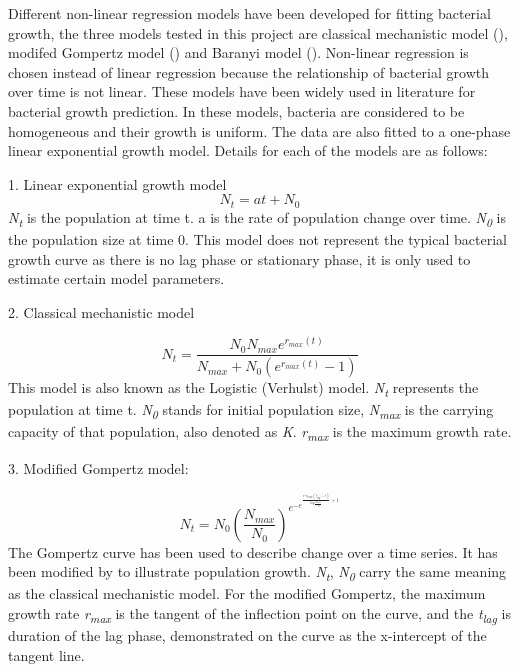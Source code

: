 \documentclass[11pt]{article}
\begin{document}
Different non-linear regression models have been developed for fitting bacterial growth, the three models tested in this project are classical mechanistic model (\citealt{verhulst1838notice}), modifed Gompertz model (\citealt{PMID:16348228}) and Baranyi model (\citealt{BARANYI1994277}). Non-linear regression is chosen instead of linear regression because the relationship of bacterial growth over time is not linear. These models have been widely used in literature for bacterial growth prediction. In these models, bacteria are considered to be homogeneous and their growth is uniform. The data are also fitted to a one-phase linear exponential growth model. Details for each of the models are as follows:

1. Linear exponential growth model
\begin{equation}
    N_{t} = at + N_{0}
\end{equation}
\emph{N\textsubscript{t}} is the population at time t. a is the rate of population change over time. \emph{N\textsubscript{0}} is the population size at time 0. This model does not represent the typical bacterial growth curve as there is no lag phase or stationary phase, it is only used to estimate certain model parameters. 

2. Classical mechanistic model

\begin{equation}
    N_{t} = \frac{N_{0} N_{max}  e^{r_{max}(t)}} {N_{max} + N_{0}  (e^{r_{max}(t)} - 1)}
\end{equation}
This model is also known as the Logistic (Verhulst) model. \emph{N\textsubscript{t}} represents the population at time t.  \emph{N\textsubscript{0}} stands for initial population size,  \emph{N\textsubscript{max}} is the carrying capacity of that population, also denoted as \emph{K}. \emph{r\textsubscript{max}} is the maximum growth rate. 

3. Modified Gompertz model:

\begin{equation}
    N_{t} = N_{0}(\frac{N_{max}}{N_{0}}) ^ {e ^ {-e ^ {\frac{e ^1 r_{max}(t_{lag} - t)}{log\frac{N_{max}}{N_{0}}} + 1}}}
\end{equation}
The Gompertz curve has been used to describe change over a time series. It has been modified by \citealt{PMID:16348228} to illustrate population growth. \emph{N\textsubscript{t}}, \emph{N\textsubscript{0}} carry the same meaning as the classical mechanistic model. For the modified Gompertz, the maximum growth rate \emph{r\textsubscript{max}} is the tangent of the inflection point on the curve, and the \emph{t\textsubscript{lag}} is duration of the lag phase, demonstrated on the curve as the x-intercept of the tangent line. 
\end{document}
